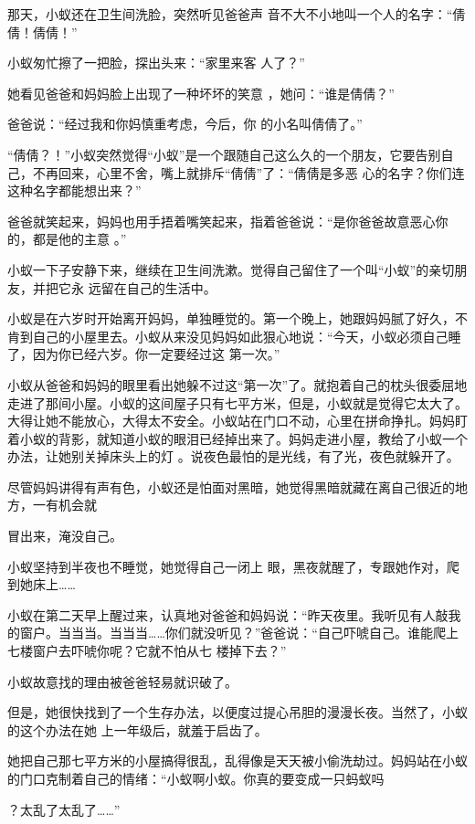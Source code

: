 \documentclass{article}
\begin{document}
那天，小蚁还在卫生间洗脸，突然听见爸爸声
音不大不小地叫一个人的名字：“倩倩！倩倩！” 

小蚁匆忙擦了一把脸，探出头来：“家里来客
人了？” 

她看见爸爸和妈妈脸上出现了一种坏坏的笑意
，她问：“谁是倩倩？” 

爸爸说：“经过我和你妈慎重考虑，今后，你
的小名叫倩倩了。” 

“倩倩？！”小蚁突然觉得“小蚁”是一个跟随自己这么久的一个朋友，它要告别自己，不再回来，心里不舍，嘴上就排斥“倩倩”了：“倩倩是多恶
心的名字？你们连这种名字都能想出来？” 

爸爸就笑起来，妈妈也用手捂着嘴笑起来，指着爸爸说：“是你爸爸故意恶心你的，都是他的主意
。” 

\newpage

小蚁一下子安静下来，继续在卫生间洗漱。觉得自己留住了一个叫“小蚁”的亲切朋友，并把它永
远留在自己的生活中。 

小蚁是在六岁时开始离开妈妈，单独睡觉的。第一个晚上，她跟妈妈腻了好久，不肯到自己的小屋里去。小蚁从来没见妈妈如此狠心地说：“今天，小蚁必须自己睡了，因为你已经六岁。你一定要经过这
第一次。” 

小蚁从爸爸和妈妈的眼里看出她躲不过这“第一次”了。就抱着自己的枕头很委屈地走进了那间小屋。小蚁的这间屋子只有七平方米，但是，小蚁就是觉得它太大了。大得让她不能放心，大得太不安全。小蚁站在门口不动，心里在拼命挣扎。妈妈盯着小蚁的背影，就知道小蚁的眼泪已经掉出来了。妈妈走进小屋，教给了小蚁一个办法，让她别关掉床头上的灯
。说夜色最怕的是光线，有了光，夜色就躲开了。 

尽管妈妈讲得有声有色，小蚁还是怕面对黑暗，她觉得黑暗就藏在离自己很近的地方，一有机会就
\newpage

冒出来，淹没自己。 

小蚁坚持到半夜也不睡觉，她觉得自己一闭上
眼，黑夜就醒了，专跟她作对，爬到她床上…… 

小蚁在第二天早上醒过来，认真地对爸爸和妈妈说：“昨天夜里。我听见有人敲我的窗户。当当当。当当当……你们就没听见？”爸爸说：“自己吓唬自己。谁能爬上七楼窗户去吓唬你呢？它就不怕从七
楼掉下去？” 


小蚁故意找的理由被爸爸轻易就识破了。 

但是，她很快找到了一个生存办法，以便度过提心吊胆的漫漫长夜。当然了，小蚁的这个办法在她
上一年级后，就羞于启齿了。 

她把自己那七平方米的小屋搞得很乱，乱得像是天天被小偷洗劫过。妈妈站在小蚁的门口克制着自己的情绪：“小蚁啊小蚁。你真的要变成一只蚂蚁吗

\newpage
？太乱了太乱了……” 
\end{document}
